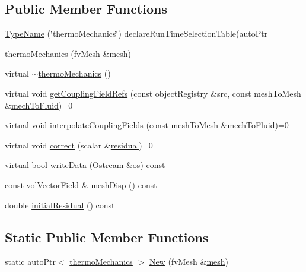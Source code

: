 \subsection*{Public Member Functions}
\begin{DoxyCompactItemize}
\item 
\hyperlink{classFoam_1_1thermoMechanics_a6534f25e59ae25e221ce06490b9ee6ae}{Type\+Name} (\char`\"{}thermo\+Mechanics\char`\"{}) declare\+Run\+Time\+Selection\+Table(auto\+Ptr
\item 
\hyperlink{classFoam_1_1thermoMechanics_a0dd79cf09378629aa0e5971cc56efe80}{thermo\+Mechanics} (fv\+Mesh \&\hyperlink{classFoam_1_1thermoMechanics_a8bb1e58291d2d2b653e024a4f4bffe38}{mesh})
\item 
virtual \hyperlink{classFoam_1_1thermoMechanics_a0aa257ab6a63fa0a56ec7344e9551645}{$\sim$thermo\+Mechanics} ()
\item 
virtual void \hyperlink{classFoam_1_1thermoMechanics_a851c93a72329c6a1da7a1a6347352c28}{get\+Coupling\+Field\+Refs} (const object\+Registry \&src, const mesh\+To\+Mesh \&\hyperlink{createMeshInterpolators_8H_afda02081b00dd9bbf0a215328f6833e0}{mech\+To\+Fluid})=0
\item 
virtual void \hyperlink{classFoam_1_1thermoMechanics_a8329d740aca8e3231de641c6573064fc}{interpolate\+Coupling\+Fields} (const mesh\+To\+Mesh \&\hyperlink{createMeshInterpolators_8H_afda02081b00dd9bbf0a215328f6833e0}{mech\+To\+Fluid})=0
\item 
virtual void \hyperlink{classFoam_1_1thermoMechanics_a49130ce023bc84222345faad432e1221}{correct} (scalar \&\hyperlink{solveThermalMechanics_8H_a840cf6bbf9aacf15bd364b478394c3a7}{residual})=0
\item 
virtual bool \hyperlink{classFoam_1_1thermoMechanics_a73ace448c639d2e1c943852abe89af7c}{write\+Data} (Ostream \&os) const
\item 
const vol\+Vector\+Field \& \hyperlink{classFoam_1_1thermoMechanics_a6213b58fa489b44d156c2c9d39b62619}{mesh\+Disp} () const
\item 
double \hyperlink{classFoam_1_1thermoMechanics_a797eec5a8ba867667928d548a2598932}{initial\+Residual} () const
\end{DoxyCompactItemize}
\subsection*{Static Public Member Functions}
\begin{DoxyCompactItemize}
\item 
static auto\+Ptr$<$ \hyperlink{classFoam_1_1thermoMechanics}{thermo\+Mechanics} $>$ \hyperlink{classFoam_1_1thermoMechanics_aa581726a0c1808c3ec5436d0375b26fd}{New} (fv\+Mesh \&\hyperlink{classFoam_1_1thermoMechanics_a8bb1e58291d2d2b653e024a4f4bffe38}{mesh})
\end{DoxyCompactItemize}
